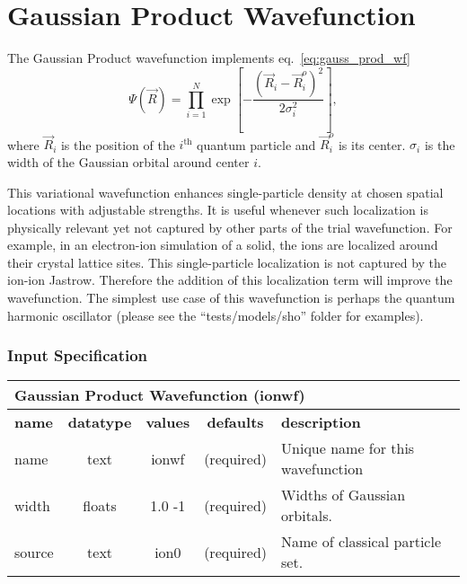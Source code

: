 \section{Gaussian Product Wavefunction}
\label{sec:ionwf}

The Gaussian Product wavefunction implements eq.~\ref{eq:gauss_prod_wf}
\begin{equation}
\Psi(\vec{R}) = \prod_{i=1}^N \exp\left[ -\frac{(\vec{R}_i-\vec{R}_i^o)^2}{2\sigma_i^2} \right]
\label{eq:gauss_prod_wf},
\end{equation}
where $\vec{R}_i$ is the position of the $i^{\text{th}}$ quantum particle and $\vec{R}_i^o$ is its center. $\sigma_i$ is the width of the Gaussian orbital around center $i$.

This variational wavefunction enhances single-particle density at chosen spatial locations with adjustable strengths. It is useful whenever such localization is physically relevant yet not captured by other parts of the trial wavefunction. For example, in an electron-ion simulation of a solid, the ions are localized around their crystal lattice sites. This single-particle localization is not captured by the ion-ion Jastrow. Therefore the addition of this localization term will improve the wavefunction. The simplest use case of this wavefunction is perhaps the quantum harmonic oscillator (please see the ``tests/models/sho'' folder for examples).

\subsubsection{Input Specification}

\begin{table}[h]
\begin{center}
\begin{tabular}{l c c c l }
\hline
\multicolumn{5}{l}{Gaussian Product Wavefunction (ionwf)} \\
\hline
\bfseries name & \bfseries datatype & \bfseries values & \bfseries defaults  & \bfseries description \\
\hline
name & text & ionwf & (required) & Unique name for this wavefunction \\
width & floats & 1.0 -1 & (required) & Widths of Gaussian orbitals.\\ 
source & text & ion0 & (required) & Name of classical particle set.\\ 
\hline
\end{tabular}
\end{center}
\end{table}

